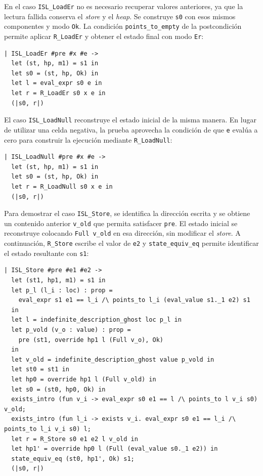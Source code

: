 \documentclass[a4paper,	11pt]{report}
\begin{document}
En el caso \lstinline|ISL_LoadEr| no es necesario recuperar valores anteriores,
ya que la lectura fallida conserva el \emph{store} y el \emph{heap}.
Se construye \lstinline|s0| con esos mismos componentes y modo \lstinline|Ok|.
La condición \lstinline|points_to_empty| de la postcondición permite aplicar \lstinline|R_LoadEr|
y obtener el estado final con modo \lstinline|Er|:

\begin{lstlisting}
| ISL_LoadEr #pre #x #e ->
  let (st, hp, m1) = s1 in
  let s0 = (st, hp, Ok) in
  let l = eval_expr s0 e in
  let r = R_LoadEr s0 x e in
  (|s0, r|)
\end{lstlisting}

El caso \lstinline|ISL_LoadNull| reconstruye el estado inicial de la misma manera.
En lugar de utilizar una celda negativa,
la prueba aprovecha la condición de que \lstinline|e| evalúa a cero para construir la ejecución mediante \lstinline|R_LoadNull|:

\begin{lstlisting}
| ISL_LoadNull #pre #x #e ->
  let (st, hp, m1) = s1 in
  let s0 = (st, hp, Ok) in
  let r = R_LoadNull s0 x e in
  (|s0, r|)
\end{lstlisting}

Para demostrar el caso \lstinline|ISL_Store|,
se identifica la dirección escrita y se obtiene un contenido anterior \lstinline|v_old| que permita satisfacer \lstinline|pre|.
El estado inicial se reconstruye colocando \lstinline|Full v_old| en esa dirección,
sin modificar el \emph{store}.
A continuación,
\lstinline|R_Store| escribe el valor de \lstinline|e2| y \lstinline|state_equiv_eq| permite identificar el estado resultante con \lstinline|s1|:

\begin{lstlisting}
| ISL_Store #pre #e1 #e2 -> 
  let (st1, hp1, m1) = s1 in
  let p_l (l_i : loc) : prop =
    eval_expr s1 e1 == l_i /\ points_to l_i (eval_value s1._1 e2) s1
  in
  let l = indefinite_description_ghost loc p_l in
  let p_vold (v_o : value) : prop =
    pre (st1, override hp1 l (Full v_o), Ok)
  in
  let v_old = indefinite_description_ghost value p_vold in
  let st0 = st1 in
  let hp0 = override hp1 l (Full v_old) in
  let s0 = (st0, hp0, Ok) in
  exists_intro (fun v_i -> eval_expr s0 e1 == l /\ points_to l v_i s0) v_old;
  exists_intro (fun l_i -> exists v_i. eval_expr s0 e1 == l_i /\ points_to l_i v_i s0) l;
  let r = R_Store s0 e1 e2 l v_old in
  let hp1' = override hp0 l (Full (eval_value s0._1 e2)) in
  state_equiv_eq (st0, hp1', Ok) s1;
  (|s0, r|)
\end{lstlisting}
\end{document}
